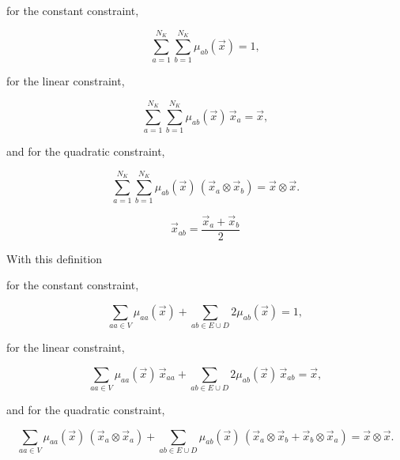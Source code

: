 for the constant constraint,

\begin{equation}
\label{eq::BF_quad_interp_req_constant}
\sum_{a=1}^{ N_K} \sum_{b=1}^{ N_K}  \mu_{ab} (\vec{x})  = 1 ,
\end{equation}

\noindent for the linear constraint,

\begin{equation}
\label{eq::BF_quad_interp_req_linear}
\sum_{a=1}^{ N_K} \sum_{b=1}^{ N_K} \mu_{ab} (\vec{x}) \, \vec{x}_a   = \vec{x} ,
\end{equation}

\noindent and for the quadratic constraint,

\begin{equation}
\label{eq::BF_quad_interp_req_quadratic}
\sum_{a=1}^{ N_K} \sum_{b=1}^{ N_K}  \mu_{ab} (\vec{x}) \, \left( \vec{x}_a \otimes \vec{x}_b \right) =  \vec{x} \otimes \vec{x} .
\end{equation}


\begin{equation}
\label{eq::BF_Quad_abbrev_pos}
\vec{x}_{ab} = \frac{\vec{x}_a + \vec{x}_b}{2}
\end{equation}

\noindent With this definition 

for the constant constraint,

\begin{equation}
\label{eq::BF_quad_interp_req_constant_alt}
\sum_{aa \in V}  \mu_{aa} (\vec{x}) + \sum_{ab \in E \cup D} 2 \mu_{ab} (\vec{x})  = 1 ,
\end{equation}

\noindent for the linear constraint,

\begin{equation}
\label{eq::BF_quad_interp_req_linear_alt}
\sum_{aa \in V}  \mu_{aa} (\vec{x}) \, \vec{x}_{aa} +  \sum_{ab \in E \cup D} 2  \mu_{ab} (\vec{x}) \, \vec{x}_{ab} = \vec{x} ,
\end{equation}

\noindent and for the quadratic constraint,

\begin{equation}
\label{eq::BF_quad_interp_req_quadratic_alt}
\sum_{aa \in V}  \mu_{aa} (\vec{x}) \, \left( \vec{x}_a \otimes \vec{x}_a \right) +  \sum_{ab \in E \cup D}   \mu_{ab} (\vec{x}) \, \left( \vec{x}_a \otimes \vec{x}_b + \vec{x}_b \otimes \vec{x}_a \right)   =  \vec{x} \otimes \vec{x} .
\end{equation}


